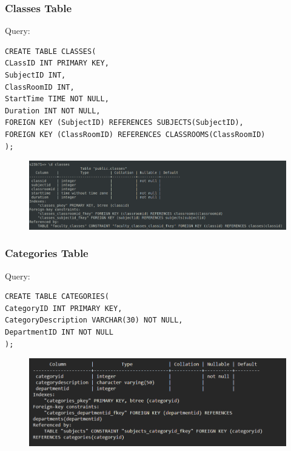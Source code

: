 \documentclass{article}
\begin{document}
\subsubsection*{Classes Table}
Query:
\begin{Verbatim}[frame=single,framerule=1pt,fontfamily=courier,fontsize=\small]
CREATE TABLE CLASSES(
CLassID INT PRIMARY KEY,
SubjectID INT,
ClassRoomID INT,
StartTime TIME NOT NULL,
Duration INT NOT NULL,
FOREIGN KEY (SubjectID) REFERENCES SUBJECTS(SubjectID),
FOREIGN KEY (ClassRoomID) REFERENCES CLASSROOMS(ClassRoomID)
);
\end{Verbatim}
\begin{figure}[H]
    \centering
    \includegraphics[width=\textwidth]{schema/classes.png}
\end{figure}

\subsubsection*{Categories Table}
Query:
\begin{Verbatim}[frame=single,framerule=1pt,fontfamily=courier,fontsize=\small]
CREATE TABLE CATEGORIES(
CategoryID INT PRIMARY KEY,
CategoryDescription VARCHAR(30) NOT NULL,
DepartmentID INT NOT NULL
);
\end{Verbatim}
\begin{figure}[H]
    \centering
    \includegraphics[width=\textwidth]{schema/categories.png}
\end{figure}
\end{document}
